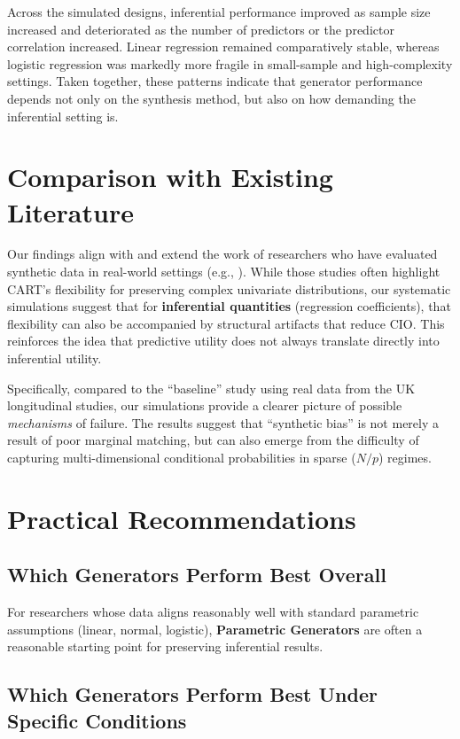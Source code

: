 Across the simulated designs, inferential performance improved as sample size increased and deteriorated as the number of predictors or the predictor correlation increased. Linear regression remained comparatively stable, whereas logistic regression was markedly more fragile in small-sample and high-complexity settings. Taken together, these patterns indicate that generator performance depends not only on the synthesis method, but also on how demanding the inferential setting is.

\section{Comparison with Existing Literature}
Our findings align with and extend the work of researchers who have evaluated synthetic data in real-world settings (e.g., \cite{nowok2016, raab2016}). While those studies often highlight CART's flexibility for preserving complex univariate distributions, our systematic simulations suggest that for \textbf{inferential quantities} (regression coefficients), that flexibility can also be accompanied by structural artifacts that reduce CIO. This reinforces the idea that predictive utility does not always translate directly into inferential utility.

Specifically, compared to the ``baseline'' study using real data from the UK longitudinal studies, our simulations provide a clearer picture of possible \emph{mechanisms} of failure. The results suggest that ``synthetic bias'' is not merely a result of poor marginal matching, but can also emerge from the difficulty of capturing multi-dimensional conditional probabilities in sparse ($N/p$) regimes.

\section{Practical Recommendations}
\label{sec:reg-recommendations}

\subsection{Which Generators Perform Best Overall}
For researchers whose data aligns reasonably well with standard parametric assumptions (linear, normal, logistic), \textbf{Parametric Generators} are often a reasonable starting point for preserving inferential results.

\subsection{Which Generators Perform Best Under Specific Conditions}

